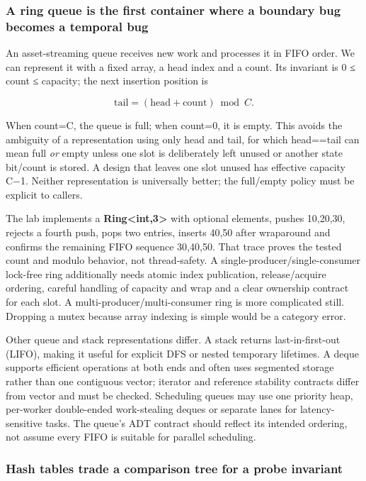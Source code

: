 \subsubsection{A ring queue is the first container where a boundary bug becomes a temporal bug}\label{a-ring-queue-is-the-first-container-where-a-boundary-bug-becomes-a-temporal-bug}

An asset-streaming queue receives new work and processes it in FIFO order. We can represent it with a fixed array, a head index and a count. Its invariant is 0 ≤ count ≤ capacity; the next insertion position is

\[
\mathrm{tail}=(\mathrm{head}+\mathrm{count})\bmod C.
\]

When count=C, the queue is full; when count=0, it is empty. This avoids the ambiguity of a representation using only head and tail, for which head==tail can mean full \emph{or} empty unless one slot is deliberately left unused or another state bit/count is stored. A design that leaves one slot unused has effective capacity C−1. Neither representation is universally better; the full/empty policy must be explicit to callers.

The lab implements a \textbf{Ring\textless int,3\textgreater{}} with optional elements, pushes 10,20,30, rejects a fourth push, pops two entries, inserts 40,50 after wraparound and confirms the remaining FIFO sequence 30,40,50. That trace proves the tested count and modulo behavior, not thread-safety. A single-producer/single-consumer lock-free ring additionally needs atomic index publication, release/acquire ordering, careful handling of capacity and wrap and a clear ownership contract for each slot. A multi-producer/multi-consumer ring is more complicated still. Dropping a mutex because array indexing is simple would be a category error.

Other queue and stack representations differ. A stack returns last-in-first-out (LIFO), making it useful for explicit DFS or nested temporary lifetimes. A deque supports efficient operations at both ends and often uses segmented storage rather than one contiguous vector; iterator and reference stability contracts differ from vector and must be checked. Scheduling queues may use one priority heap, per-worker double-ended work-stealing deques or separate lanes for latency-sensitive tasks. The queue's ADT contract should reflect its intended ordering, not assume every FIFO is suitable for parallel scheduling.

\subsubsection{Hash tables trade a comparison tree for a probe invariant}\label{hash-tables-trade-a-comparison-tree-for-a-probe-invariant}

